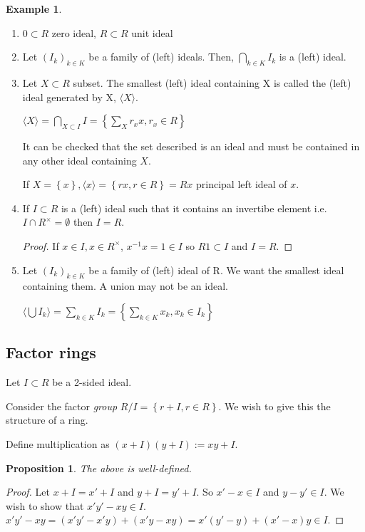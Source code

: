 \documentclass{article}
\renewcommand\O{\ensuremath{\emptyset}}
\theoremstyle{definition}
\newtheorem{eg}{Example}[subsection]
\theoremstyle{remark}
\theoremstyle{plain}
\newtheorem{prop}{Proposition}[subsection]
\begin{document}
\begin{eg}
    \begin{enumerate}
        \item $0 \subset R$ zero ideal, $R \subset R$ unit ideal
        \item Let $(I_k)_{k\in K}$ be a family of (left) ideals. Then, $\bigcap\limits_{k \in K}I_k$ is a (left) ideal.
        \item Let $X \subset R$ subset. The smallest (left) ideal containing X is called the (left) ideal generated by X, $\langle X \rangle$.
    
        $\langle X \rangle= \bigcap\limits_{X\subset I}I = \left\{ \sum_{X}r_xx, r_x \in R \right\}$

        It can be checked that the set described is an ideal and must be contained in any other ideal containing $X$.

        If $X = \left\{ {x} \right\}, \langle x \rangle = \left\{ rx, r\in R \right\} = Rx$ principal left ideal of $x$.
        \item If $I \subset R$ is a (left) ideal such that it contains an invertibe element i.e. $I\cap R^{\times} = \O$ then $I=R$.
        \begin{proof}
            If $x \in I, x \in R^{\times}$, $x^{-1}x = 1 \in I$ so $R1\subset I$ and $I = R$.
        \end{proof}
        \item Let $(I_k)_{k \in K}$ be a family of (left) ideal of R. We want the smallest ideal containing them. A union may not be an ideal.
        
        $\langle \bigcup I_k \rangle = \sum\limits_{k\in K}I_k = \left\{ \sum\limits_{k \in K}x_k, x_k \in I_k \right\}$

    \end{enumerate}
\end{eg}
    
\subsection{Factor rings}

Let $I\subset R$ be a 2-sided ideal. 

Consider the factor \textit{group} $R/I = \left\{ r+I, r \in R \right\}$. We wish to give this the structure of a ring. 

Define multiplication as $(x+I)(y+I):=xy + I$. 

\begin{prop}
    The above is well-defined.
\end{prop}
\begin{proof}
    Let $x+I = x' + I$ and $y+I = y' + I$. So $x'-x \in I$ and $y-y' \in I$. We wish to show that $x'y' - xy \in I$. $x'y' - xy = (x'y' -x'y) + (x'y -xy) = x'(y'-y)+ (x'-x)y \in I$.
\end{proof}
\end{document}
